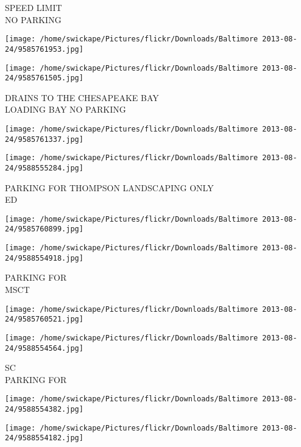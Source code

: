 \documentclass[10pt,letterpaper]{article}
\begin{document}
SPEED LIMIT\\
NO PARKING\\
\pagebreak

\texttt{[image: /home/swickape/Pictures/flickr/Downloads/Baltimore 2013-08-24/9585761953.jpg]}

\vspace{0.25in}
\texttt{[image: /home/swickape/Pictures/flickr/Downloads/Baltimore 2013-08-24/9585761505.jpg]}

DRAINS TO THE CHESAPEAKE BAY\\
LOADING BAY NO PARKING\\
\pagebreak

\texttt{[image: /home/swickape/Pictures/flickr/Downloads/Baltimore 2013-08-24/9585761337.jpg]}

\vspace{0.25in}
\texttt{[image: /home/swickape/Pictures/flickr/Downloads/Baltimore 2013-08-24/9588555284.jpg]}

PARKING FOR THOMPSON LANDSCAPING ONLY\\
ED\\
\pagebreak

\texttt{[image: /home/swickape/Pictures/flickr/Downloads/Baltimore 2013-08-24/9585760899.jpg]}

\vspace{0.25in}
\texttt{[image: /home/swickape/Pictures/flickr/Downloads/Baltimore 2013-08-24/9588554918.jpg]}

PARKING FOR\\
MSCT\\
\pagebreak

\texttt{[image: /home/swickape/Pictures/flickr/Downloads/Baltimore 2013-08-24/9585760521.jpg]}

\vspace{0.25in}
\texttt{[image: /home/swickape/Pictures/flickr/Downloads/Baltimore 2013-08-24/9588554564.jpg]}

SC\\
PARKING FOR\\
\pagebreak

\texttt{[image: /home/swickape/Pictures/flickr/Downloads/Baltimore 2013-08-24/9588554382.jpg]}

\vspace{0.25in}
\texttt{[image: /home/swickape/Pictures/flickr/Downloads/Baltimore 2013-08-24/9588554182.jpg]}
\end{document}
